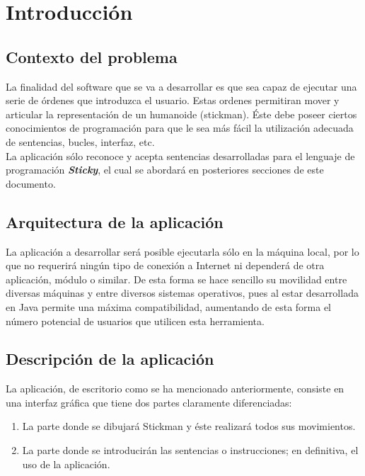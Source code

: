 \chapter{Introducción}

   \section{Contexto del problema}
   La finalidad del software que se va a desarrollar es que sea capaz de ejecutar una serie de órdenes que introduzca el usuario. Estas ordenes
   permitiran mover y articular la representación de un humanoide (stickman). Éste debe poseer ciertos conocimientos de programación para que le sea más 
   fácil la utilización adecuada de sentencias, bucles, interfaz, etc.\\

   La aplicación sólo reconoce y acepta sentencias desarrolladas para el lenguaje de programación \textbf{\textit{Sticky}}, el cual se abordará
   en posteriores secciones de este documento.\\


   \section{Arquitectura de la aplicación}
   La aplicación a desarrollar será posible ejecutarla sólo en la máquina local, por lo que no requerirá ningún tipo de conexión a Internet ni
   dependerá de otra aplicación, módulo o similar. De esta forma se hace sencillo su movilidad entre diversas máquinas y entre diversos sistemas
   operativos, pues al estar desarrollada en Java permite una máxima compatibilidad, aumentando de esta forma el número potencial de usuarios que
   utilicen esta herramienta.\\

   \section{Descripción de la aplicación}
   La aplicación, de escritorio como se ha mencionado anteriormente, consiste en una interfaz gráfica que tiene dos partes claramente diferenciadas: 
   \begin{enumerate}
      \item La parte donde se dibujará Stickman y éste realizará todos sus movimientos. 
      \item La parte donde se introducirán las sentencias o instrucciones; en definitiva, el uso de la aplicación.\\
   \end{enumerate}

